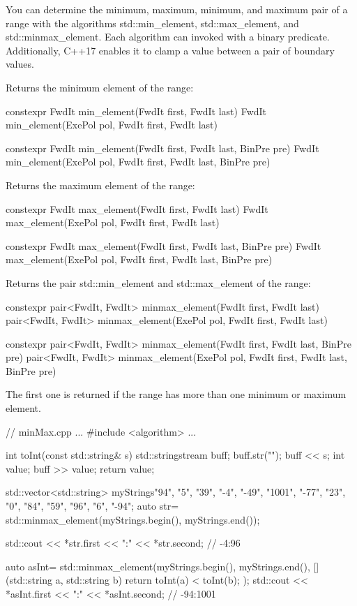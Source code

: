 You can determine the minimum, maximum, minimum, and maximum pair of a range with the algorithms std::min\_element, std::max\_element, and std::minmax\_element. Each algorithm can invoked with a binary predicate. Additionally, C++17 enables it to clamp a value between a pair of boundary values.

Returns the minimum element of the range:

\begin{cpp}
constexpr FwdIt min_element(FwdIt first, FwdIt last)
FwdIt min_element(ExePol pol, FwdIt first, FwdIt last)

constexpr FwdIt min_element(FwdIt first, FwdIt last, BinPre pre)
FwdIt min_element(ExePol pol, FwdIt first, FwdIt last, BinPre pre)
\end{cpp}

Returns the maximum element of the range:

\begin{cpp}
constexpr FwdIt max_element(FwdIt first, FwdIt last)
FwdIt max_element(ExePol pol, FwdIt first, FwdIt last)

constexpr FwdIt max_element(FwdIt first, FwdIt last, BinPre pre)
FwdIt max_element(ExePol pol, FwdIt first, FwdIt last, BinPre pre)
\end{cpp}

Returns the pair std::min\_element and std::max\_element of the range:

\begin{cpp}
constexpr pair<FwdIt, FwdIt> minmax_element(FwdIt first, FwdIt last)
pair<FwdIt, FwdIt> minmax_element(ExePol pol, FwdIt first, FwdIt last)

constexpr pair<FwdIt, FwdIt> minmax_element(FwdIt first, FwdIt last, BinPre pre)
pair<FwdIt, FwdIt> minmax_element(ExePol pol, FwdIt first, FwdIt last,
								  BinPre pre)
\end{cpp}

The first one is returned if the range has more than one minimum or maximum element.


\begin{cpp}
// minMax.cpp
...
#include <algorithm>
...

int toInt(const std::string& s){
	std::stringstream buff;
	buff.str("");
	buff << s;
	int value;
	buff >> value;
	return value;
}

std::vector<std::string> myStrings{"94", "5", "39", "-4", "-49", "1001", "-77",
							       "23", "0", "84", "59", "96", "6", "-94"};
auto str= std::minmax_element(myStrings.begin(), myStrings.end());

std::cout << *str.first << ":" << *str.second; // -4:96

auto asInt= std::minmax_element(myStrings.begin(), myStrings.end(),
			[](std::string a, std::string b){ return toInt(a) < toInt(b); });
std::cout << *asInt.first << ":" << *asInt.second; // -94:1001
\end{cpp}

